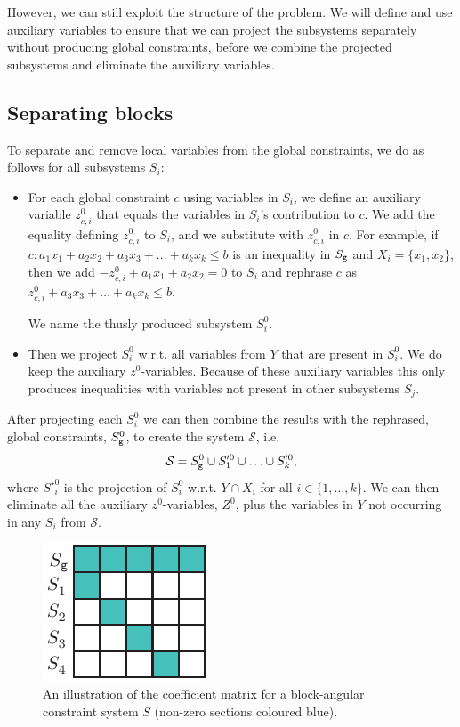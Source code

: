 However, we can still exploit the structure of the problem. We will define and use auxiliary variables to ensure that we can project the subsystems separately without producing global constraints, before we combine the projected  subsystems and eliminate the auxiliary variables.
 
\subsection{Separating blocks}
To separate and remove local variables from the global constraints, we do as follows for all subsystems $S_i$:
\begin{itemize}\itemsep0em
\item For each global constraint $c$ using variables in $S_i$, we define an auxiliary variable $z^0_{c,i}$ that equals the variables in $S_i$'s contribution to $c$. We add the equality defining $z^0_{c,i}$ to $S_i$, and we substitute with $z^0_{c,i}$ in $c$. For example, if $c: a_1x_1 + a_2x_2 + a_3x_3 + \ldots + a_kx_k \leq b$ is an inequality in $S_{\texttt{g}}$ and $X_i = \{x_1,x_2\}$, then we add $-z^0_{c,i} + a_1x_1 + a_2x_2 = 0$ to $S_i$ and rephrase $c$ as $z^0_{c,i} + a_3x_3 + \ldots + a_kx_k \leq b$. 

We name the thusly produced subsystem $S_i^0$. 
\item Then we project $S_i^0$ w.r.t. all variables from $Y$ that are present in $S_i^0$. We do keep the auxiliary $z^0$-variables. 
Because of these auxiliary variables this only produces inequalities with variables not present in other subsystems $S_j$. 
\end{itemize}
After projecting each $S_i^0$ we can then combine the results with the rephrased, global constraints, $S_{\texttt{g}}^0$, to create the system $\mathcal{S}$, i.e. 
\begin{equation}\label{eq:curlyS}
\mathcal{S} = S^0_{\texttt{g}} \cup S'^0_1\cup \ldots \cup S'^0_k,
\end{equation}
where $S'^0_i$ is the projection of $S^0_i$ w.r.t. $Y\cap X_i$ for all $i\in\{1,\ldots, k\}$.
We can then eliminate all the auxiliary $z^0$-variables, $Z^0$, plus the variables in $Y$ not occurring in any $S_i$ from $\mathcal{S}$. %

\begin{figure}[htbp]
	\centering
		\includegraphics{figures/blockStructure.pdf}
	\caption{An illustration of the coefficient matrix for a block-angular constraint system $S$ (non-zero sections coloured blue).}
	\label{fig:decomp}
\end{figure}


